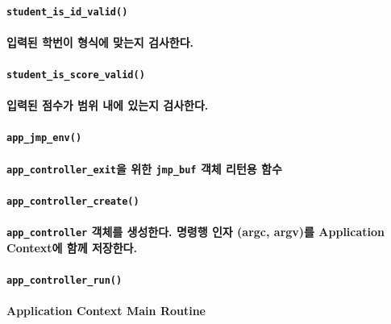 \documentclass[UTF8]{report}
\begin{document}
            \paragraph{\texttt{student\_is\_id\_valid()}}
            \paragraph{%
                \normalfont 입력된 학번이 형식에 맞는지 검사한다.
            }

            \paragraph{\texttt{student\_is\_score\_valid()}}
            \paragraph{%
                \normalfont 입력된 점수가 범위 내에 있는지 검사한다.
            }

            \paragraph{\texttt{app\_jmp\_env()}}
            \paragraph{%
                \normalfont \texttt{app\_controller\_exit}을 위한 \texttt{jmp\_buf} 객체 리턴용 함수
            }

            \paragraph{\texttt{app\_controller\_create()}}
            \paragraph{%
                \normalfont \texttt{app\_controller} 객체를 생성한다. 명령행 인자 (argc, argv)를 Application Context에 함께 저장한다.
            }

            \paragraph{\texttt{app\_controller\_run()}}
            \paragraph{%
                \normalfont Application Context Main Routine
            }
\end{document}
